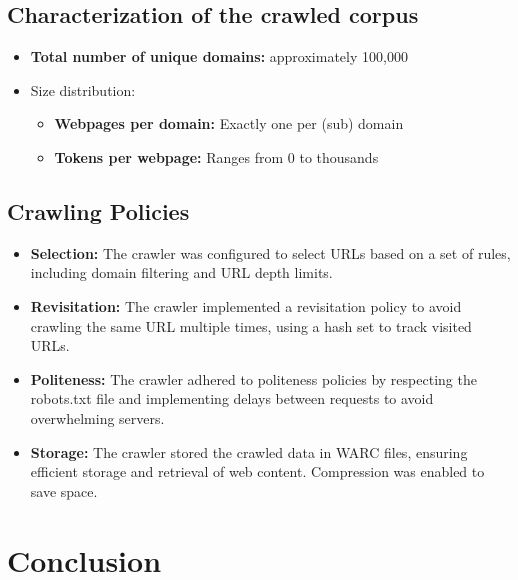 \subsection{Characterization of the crawled corpus}


\begin{itemize}
  \item \textbf{Total number of unique domains:} approximately 100,000
  \item Size distribution:
        \begin{itemize}
          \item \textbf{Webpages per domain:} Exactly one per (sub) domain
          \item \textbf{Tokens per webpage:} Ranges from 0 to thousands
        \end{itemize}
\end{itemize}

\subsection{Crawling Policies}

\begin{itemize}
  \item \textbf{Selection:} The crawler was configured to select URLs based on a set of rules, including domain filtering and URL depth limits.
  \item \textbf{Revisitation:} The crawler implemented a revisitation policy to avoid crawling the same URL multiple times, using a hash set to track visited URLs.
  \item \textbf{Politeness:} The crawler adhered to politeness policies by respecting the robots.txt file and implementing delays between requests to avoid overwhelming servers.
  \item \textbf{Storage:} The crawler stored the crawled data in WARC files, ensuring efficient storage and retrieval of web content. Compression was enabled to save space.
\end{itemize}

\section{Conclusion}

